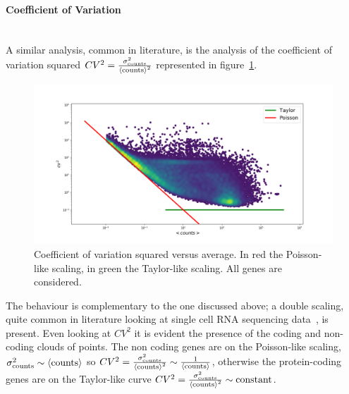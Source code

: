 \paragraph{Coefficient of Variation}\mbox{}\\
A similar analysis, common in literature, is the analysis of the coefficient of variation squared $CV^2=\frac{\sigma^2_{\mathrm{counts}}}{\left\langle \mathrm{counts}\right\rangle^2}$ represented in figure~\ref{fig:scalinglaws/gtex/allgenes/cvmean_loglog}.
\begin{figure}[htb!]
    \centering
    \includegraphics[width=0.9\linewidth]{pictures/scalinglaws/gtex/allgenes/cvmean_loglog.png}
    \caption{Coefficient of variation squared versus average. In \textcolor{pythonred}{red} the Poisson-like scaling, in \textcolor{pythongreen}{green} the Taylor-like scaling. All genes are considered.}
    \label{fig:scalinglaws/gtex/allgenes/cvmean_loglog}
\end{figure}
The behaviour is complementary to the one discussed above; a double scaling, quite common in literature looking at single cell RNA sequencing data~\cite{Islam2013}, is present. Even looking at $CV^2$ it is evident the presence of the coding and non-coding clouds of points. The non coding genes are on the Poisson-like scaling, $\sigma^2_{\mathrm{counts}} \sim \left\langle \mathrm{counts}\right\rangle$ so $CV^2=\frac{\sigma^2_{\mathrm{counts}}}{\left\langle \mathrm{counts}\right\rangle^2}\sim\frac{1}{\left\langle \mathrm{counts}\right\rangle}$, otherwise the protein-coding genes are on the Taylor-like curve $CV^2=\frac{\sigma^2_{\mathrm{counts}}}{\left\langle \mathrm{counts}\right\rangle^2}\sim \text{constant}$.

